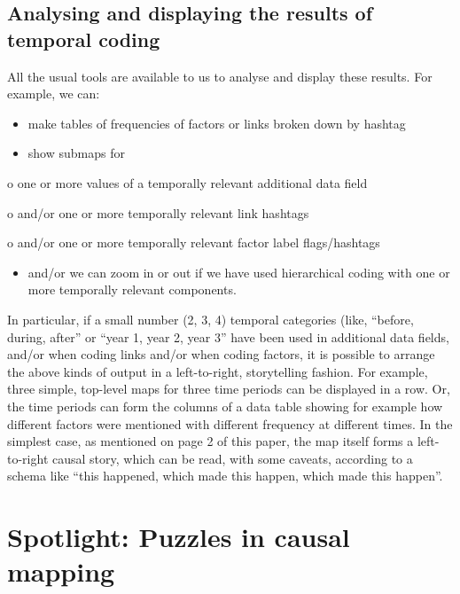\documentclass[
]{book}
\providecommand{\tightlist}{%
  \setlength{\itemsep}{0pt}\setlength{\parskip}{0pt}}
\begin{document}
\hypertarget{analysing-and-displaying-the-results-of-temporal-coding}{%
\section{Analysing and displaying the results of temporal coding}\label{analysing-and-displaying-the-results-of-temporal-coding}}

All the usual tools are available to us to analyse and display these results. For example, we can:

\begin{itemize}
\item
  make tables of frequencies of factors or links broken down by hashtag
\item
  show submaps for
\end{itemize}

o one or more values of a temporally relevant additional data field

o and/or one or more temporally relevant link hashtags

o and/or one or more temporally relevant factor label flags/hashtags

\begin{itemize}
\tightlist
\item
  and/or we can zoom in or out if we have used hierarchical coding with one or more temporally relevant components.
\end{itemize}

In particular, if a small number (2, 3, 4) temporal categories (like, ``before, during, after'' or ``year 1, year 2, year 3'' have been used in additional data fields, and/or when coding links and/or when coding factors, it is possible to arrange the above kinds of output in a left-to-right, storytelling fashion. For example, three simple, top-level maps for three time periods can be displayed in a row. Or, the time periods can form the columns of a data table showing for example how different factors were mentioned with different frequency at different times. In the simplest case, as mentioned on page 2 of this paper, the map itself forms a left-to-right causal story, which can be read, with some caveats, according to a schema like ``this happened, which made this happen, which made this happen''.

\hypertarget{spotlight-puzzles-in-causal-mapping}{%
\chapter{Spotlight: Puzzles in causal mapping}\label{spotlight-puzzles-in-causal-mapping}}
\end{document}
